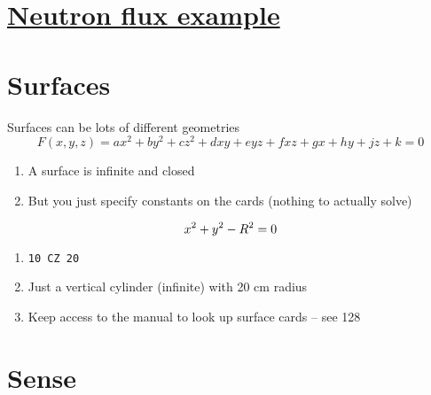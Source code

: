 \documentclass[aspectratio=1610,pdftex,dvipsnames,compress,xcolor={dvipsnames}]{beamer}
\begin{document}
\section{\href{https://github.com/TheDoctorRAB/mcnpx.decks}{Neutron flux example}}
\section{Surfaces}


\addtocounter{framenumber}{-2} 
\begin{frame}{Surfaces can be lots of different geometries}
    \begin{equation}
        F(x,y,z) = ax^2 + by^2 + cz^2 + dxy + eyz + fxz + gx + hy + jz + k = 0
    \end{equation}

    \vspace*{\fill}

    \begin{enumerate}[series=outerlist,topsep=0pt,itemsep=21pt,leftmargin=*,label=(\arabic*)]
        \item[] A surface is infinite and closed
        \item[] But you just specify constants on the cards (nothing to actually solve)
    \end{enumerate}

    \vspace*{\fill}

    \begin{equation}
        \LARGE
        x^2 + y^2 -R^2 = 0
    \end{equation}

    \vspace*{\fill}

    \begin{enumerate}[series=outerlist,topsep=0pt,itemsep=21pt,leftmargin=*,label=(\arabic*)]
        \item[]\texttt{10     CZ 20}
        \item[] Just a vertical cylinder (infinite) with 20 cm radius
        \item[] Keep access to the manual to look up surface cards -- see 128
    \end{enumerate}
\end{frame}


\section{Sense}
\end{document}
